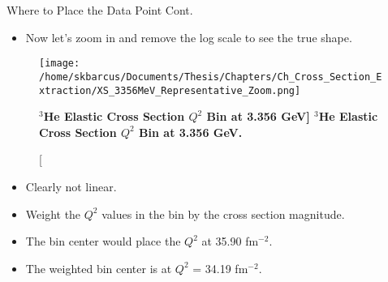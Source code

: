 \documentclass[10pt]{beamer}
\begin{document}
\begin{frame}[fragile]{Where to Place the Data Point Cont.}

	\begin{itemize}
		\item Now let's \alert{zoom in and remove the log scale} to see the true shape.
	\end{itemize}

	\pause
	\vspace{-2mm}
	\begin{figure}[!ht]
	\begin{center}
	\texttt{[image: /home/skbarcus/Documents/Thesis/Chapters/Ch\_Cross\_Section\_Extraction/XS\_3356MeV\_Representative\_Zoom.png]}
	\end{center}
	\caption[\bf{$^3$He Elastic Cross Section $Q^2$ Bin at 3.356 GeV}]{
	{\bf{$^3$He Elastic Cross Section $Q^2$ Bin at 3.356 GeV.}} }
	\label{fig:xs_bin_zoom}
	\end{figure}
	
	\pause
	\vspace{-5mm}
	\begin{itemize}
		\item Clearly \alert{not linear}.
		\item \alert{Weight the $Q^2$ values} in the bin \alert{by the cross section magnitude}.
		\pause
		\item The bin center would place the $Q^2$ at 35.90 fm$^{-2}$. 
		\item The weighted bin center is at \alert{$Q^2$ = 34.19 fm$^{-2}$}.
	\end{itemize}

\end{frame}
\end{document}
